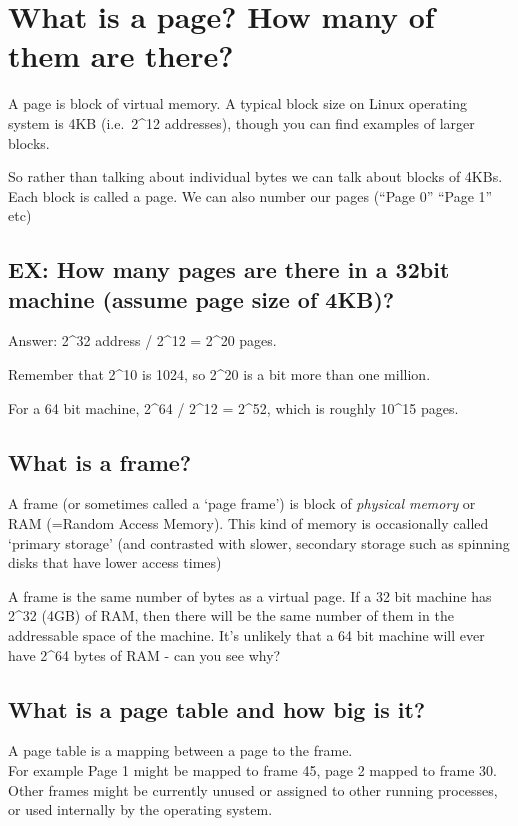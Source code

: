 \section{What is a page? How many of them are
there?}\label{what-is-a-page-how-many-of-them-are-there}

A page is block of virtual memory. A typical block size on Linux
operating system is 4KB (i.e.~2\^{}12 addresses), though you can find
examples of larger blocks.

So rather than talking about individual bytes we can talk about blocks
of 4KBs. Each block is called a page. We can also number our pages
(``Page 0'' ``Page 1'' etc)

\subsection{EX: How many pages are there in a 32bit machine (assume page
size of
4KB)?}\label{ex-how-many-pages-are-there-in-a-32bit-machine-assume-page-size-of-4kb}

Answer: 2\^{}32 address / 2\^{}12 = 2\^{}20 pages.

Remember that 2\^{}10 is 1024, so 2\^{}20 is a bit more than one
million.

For a 64 bit machine, 2\^{}64 / 2\^{}12 = 2\^{}52, which is roughly
10\^{}15 pages.

\subsection{What is a frame?}\label{what-is-a-frame}

A frame (or sometimes called a `page frame') is block of \emph{physical
memory} or RAM (=Random Access Memory). This kind of memory is
occasionally called `primary storage' (and contrasted with slower,
secondary storage such as spinning disks that have lower access times)

A frame is the same number of bytes as a virtual page. If a 32 bit
machine has 2\^{}32 (4GB) of RAM, then there will be the same number of
them in the addressable space of the machine. It's unlikely that a 64
bit machine will ever have 2\^{}64 bytes of RAM - can you see why?

\subsection{What is a page table and how big is
it?}\label{what-is-a-page-table-and-how-big-is-it}

A page table is a mapping between a page to the frame.\\For example Page
1 might be mapped to frame 45, page 2 mapped to frame 30. Other frames
might be currently unused or assigned to other running processes, or
used internally by the operating system.

